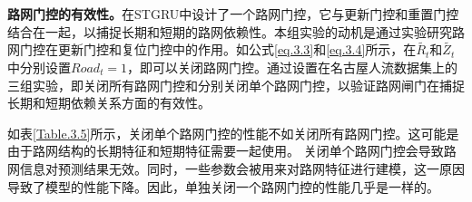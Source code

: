 \documentclass[master]{thesis-uestc}
\begin{document}
\textbf{路网门控的有效性。}在STGRU中设计了一个路网门控，它与更新门控和重置门控结合在一起，以捕捉长期和短期的路网依赖性。本组实验的动机是通过实验研究路网门控在更新门控和复位门控中的作用。如公式\ref{eq.3.3}和\ref{eq.3.4}所示，在$\tilde{R_t}$和$\tilde{Z_t}$中分别设置$Road_t = 1$，即可以关闭路网门控。通过设置在名古屋人流数据集上的三组实验，即关闭所有路网门控和分别关闭单个路网门控，以验证路网闸门在捕捉长期和短期依赖关系方面的有效性。
\begin{table}[ht]
\centering
\caption{路网门控对模型性能的影响}
\label{Table.3.5}
\end{table}

如表\ref{Table.3.5}所示，关闭单个路网门控的性能不如关闭所有路网门控。这可能是由于路网结构的长期特征和短期特征需要一起使用。
关闭单个路网门控会导致路网信息对预测结果无效。同时，一些参数会被用来对路网特征进行建模，这一原因导致了模型的性能下降。因此，单独关闭一个路网门控的性能几乎是一样的。
\end{document}
